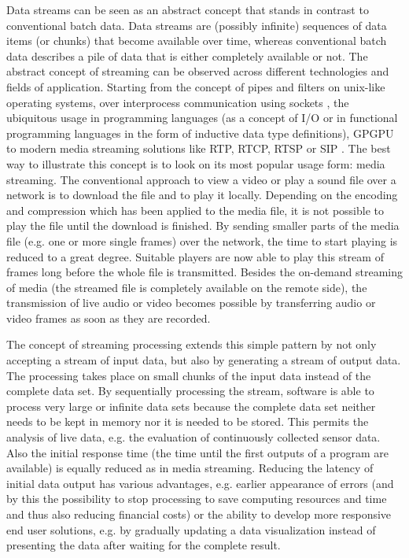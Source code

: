   Data streams can be seen as an abstract concept that stands in contrast to conventional batch data. Data streams are (possibly infinite) sequences of data items (or chunks) that become available over time, whereas conventional batch data describes a pile of data that is either completely available or not. The abstract concept of streaming can be observed across different technologies and fields of application. Starting from the concept of pipes and filters on unix-like operating systems, over interprocess communication using sockets \citep[either local or over a network,][]{buschmann1996pattern}, the ubiquitous usage in programming languages (as a concept of I/O or in functional programming languages in the form of inductive data type definitions), \ac{GPGPU} to modern media streaming solutions like RTP, RTCP, RTSP \citep{ietf:rfc3550,ietf:rfc2326} or SIP \citep{ietf:rfc3261}. The best way to illustrate this concept is to look on its most popular usage form: media streaming. The conventional approach to view a video or play a sound file over a network is to download the file and to play it locally. Depending on the encoding and compression which has been applied to the media file, it is not possible to play the file until the download is finished. By sending smaller parts of the media file (e.g. one or more single frames) over the network, the time to start playing is reduced to a great degree. Suitable players are now able to play this stream of frames long before the whole file is transmitted. Besides the on-demand streaming of media (the streamed file is completely available on the remote side), the transmission of live audio or video becomes possible by transferring audio or video frames as soon as they are recorded.

  The concept of streaming processing extends this simple pattern by not only accepting a stream of input data, but also by generating a stream of output data. The processing takes place on small chunks of the input data instead of the complete data set. By sequentially processing the stream, software is able to process very large or infinite data sets because the complete data set neither needs to be kept in memory nor it is needed to be stored. This permits the analysis of live data, e.g. the evaluation of continuously collected sensor data. Also the initial response time (the time until the first outputs of a program are available) is equally reduced as in media streaming. Reducing the latency of initial data output has various advantages, e.g. earlier appearance of errors (and by this the possibility to stop processing to save computing resources and time and thus also reducing financial costs) or the ability to develop more responsive end user solutions, e.g. by gradually updating a data visualization instead of presenting the data after waiting for the complete result.

